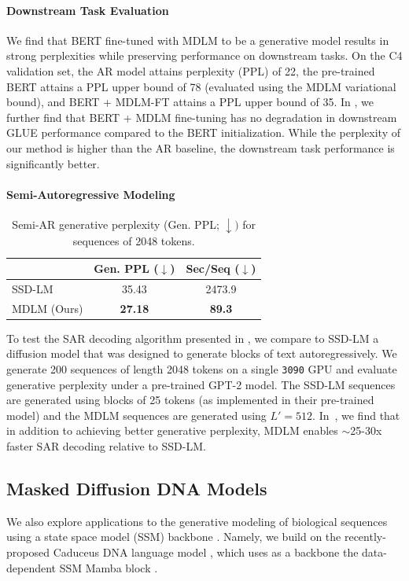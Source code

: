 \documentclass{article} %
\def\algo{MDLM}
\begin{document}
{\paragraph{Downstream Task Evaluation}
We find that BERT fine-tuned with \algo{} to be a generative model results in strong perplexities while preserving performance on downstream tasks.
On the C4 validation set, the AR model attains perplexity (PPL) of 22, the pre-trained BERT attains a PPL upper bound of 78 (evaluated using the \algo{} variational bound), and BERT + \algo{}-FT attains a PPL upper bound of 35.
In , we further find that BERT + \algo{} fine-tuning has no degradation in downstream GLUE performance compared to the BERT initialization.
While the perplexity of our method is higher than the AR baseline, the downstream task performance is significantly better.

\paragraph{Semi-Autoregressive Modeling}
\begin{table}
  \vspace{-1.35em}
  \caption{Semi-AR generative perplexity (Gen. PPL; $\downarrow)$ for sequences of 2048 tokens.
  }
  \label{tab:semi-ar}
  \centering
  \begin{tabular}{lcc}
    \toprule
    & Gen. PPL ($\downarrow$) & Sec/Seq ($\downarrow$) \\
    \midrule
    SSD-LM & 35.43 & 2473.9 \\
    \algo{} (Ours) & \bf{27.18} & \bf{89.3}\\
    \bottomrule
  \end{tabular}
\end{table}
To test the SAR decoding algorithm presented in , we compare to SSD-LM \citep{han2022ssd}
a diffusion model that was designed to generate blocks of text autoregressively.
We generate 200 sequences of length 2048 tokens on a single \texttt{3090} GPU and evaluate generative perplexity under a pre-trained GPT-2 \citep{radford2019language} model.
The SSD-LM sequences are generated using blocks of 25 tokens (as implemented in their pre-trained model) and the \algo{} sequences are generated using $L' = 512$.
In~, we find that in addition to achieving better generative perplexity, \algo{} enables $\sim$25-30x faster SAR decoding relative to SSD-LM.



\subsection{Masked Diffusion DNA Models}
We also explore applications to the generative modeling of biological sequences \citep{deshpande2022deep,rastogi2023semi} using a state space model (SSM) backbone \citep{gu2021efficiently}.
Namely, we build on the recently-proposed Caduceus DNA language model \citep{schiff2024caduceus}, which uses as a backbone the data-dependent SSM Mamba block \citep{gu2023mamba}.

}
\end{document}
